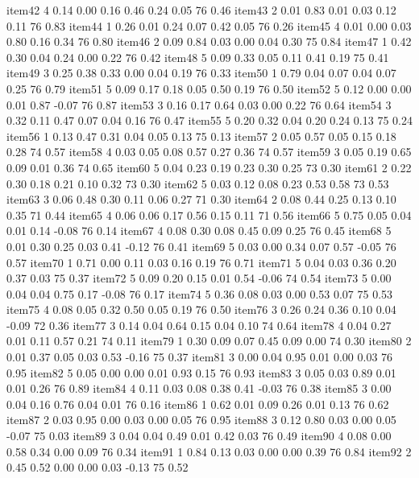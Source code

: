 \documentclass[10pt,man]{apa6}\usepackage{graphicx, color}
\begin{document}
\begin{Schunk}
\begin{Soutput}
item42    4 0.14 0.00 0.16 0.46 0.24  0.05 76 0.46
item43    2 0.01 0.83 0.01 0.03 0.12  0.11 76 0.83
item44    1 0.26 0.01 0.24 0.07 0.42  0.05 76 0.26
item45    4 0.01 0.00 0.03 0.80 0.16  0.34 76 0.80
item46    2 0.09 0.84 0.03 0.00 0.04  0.30 75 0.84
item47    1 0.42 0.30 0.04 0.24 0.00  0.22 76 0.42
item48    5 0.09 0.33 0.05 0.11 0.41  0.19 75 0.41
item49    3 0.25 0.38 0.33 0.00 0.04  0.19 76 0.33
item50    1 0.79 0.04 0.07 0.04 0.07  0.25 76 0.79
item51    5 0.09 0.17 0.18 0.05 0.50  0.19 76 0.50
item52    5 0.12 0.00 0.00 0.01 0.87 -0.07 76 0.87
item53    3 0.16 0.17 0.64 0.03 0.00  0.22 76 0.64
item54    3 0.32 0.11 0.47 0.07 0.04  0.16 76 0.47
item55    5 0.20 0.32 0.04 0.20 0.24  0.13 75 0.24
item56    1 0.13 0.47 0.31 0.04 0.05  0.13 75 0.13
item57    2 0.05 0.57 0.05 0.15 0.18  0.28 74 0.57
item58    4 0.03 0.05 0.08 0.57 0.27  0.36 74 0.57
item59    3 0.05 0.19 0.65 0.09 0.01  0.36 74 0.65
item60    5 0.04 0.23 0.19 0.23 0.30  0.25 73 0.30
item61    2 0.22 0.30 0.18 0.21 0.10  0.32 73 0.30
item62    5 0.03 0.12 0.08 0.23 0.53  0.58 73 0.53
item63    3 0.06 0.48 0.30 0.11 0.06  0.27 71 0.30
item64    2 0.08 0.44 0.25 0.13 0.10  0.35 71 0.44
item65    4 0.06 0.06 0.17 0.56 0.15  0.11 71 0.56
item66    5 0.75 0.05 0.04 0.01 0.14 -0.08 76 0.14
item67    4 0.08 0.30 0.08 0.45 0.09  0.25 76 0.45
item68    5 0.01 0.30 0.25 0.03 0.41 -0.12 76 0.41
item69    5 0.03 0.00 0.34 0.07 0.57 -0.05 76 0.57
item70    1 0.71 0.00 0.11 0.03 0.16  0.19 76 0.71
item71    5 0.04 0.03 0.36 0.20 0.37  0.03 75 0.37
item72    5 0.09 0.20 0.15 0.01 0.54 -0.06 74 0.54
item73    5 0.00 0.04 0.04 0.75 0.17 -0.08 76 0.17
item74    5 0.36 0.08 0.03 0.00 0.53  0.07 75 0.53
item75    4 0.08 0.05 0.32 0.50 0.05  0.19 76 0.50
item76    3 0.26 0.24 0.36 0.10 0.04 -0.09 72 0.36
item77    3 0.14 0.04 0.64 0.15 0.04  0.10 74 0.64
item78    4 0.04 0.27 0.01 0.11 0.57  0.21 74 0.11
item79    1 0.30 0.09 0.07 0.45 0.09  0.00 74 0.30
item80    2 0.01 0.37 0.05 0.03 0.53 -0.16 75 0.37
item81    3 0.00 0.04 0.95 0.01 0.00  0.03 76 0.95
item82    5 0.05 0.00 0.00 0.01 0.93  0.15 76 0.93
item83    3 0.05 0.03 0.89 0.01 0.01  0.26 76 0.89
item84    4 0.11 0.03 0.08 0.38 0.41 -0.03 76 0.38
item85    3 0.00 0.04 0.16 0.76 0.04  0.01 76 0.16
item86    1 0.62 0.01 0.09 0.26 0.01  0.13 76 0.62
item87    2 0.03 0.95 0.00 0.03 0.00  0.05 76 0.95
item88    3 0.12 0.80 0.03 0.00 0.05 -0.07 75 0.03
item89    3 0.04 0.04 0.49 0.01 0.42  0.03 76 0.49
item90    4 0.08 0.00 0.58 0.34 0.00  0.09 76 0.34
item91    1 0.84 0.13 0.03 0.00 0.00  0.39 76 0.84
item92    2 0.45 0.52 0.00 0.00 0.03 -0.13 75 0.52

\end{Soutput}
\end{Schunk}
\end{document}
